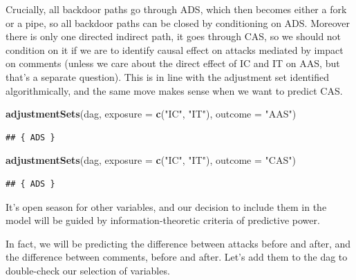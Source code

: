 \documentclass[10pt,dvipsnames,enabledeprecatedfontcommands]{scrartcl}
\newenvironment{Shaded}{\begin{snugshade}}{\end{snugshade}}
\newcommand{\DataTypeTok}[1]{\textcolor[rgb]{0.13,0.29,0.53}{#1}}
\newcommand{\KeywordTok}[1]{\textcolor[rgb]{0.13,0.29,0.53}{\textbf{#1}}}
\newcommand{\NormalTok}[1]{#1}
\newcommand{\StringTok}[1]{\textcolor[rgb]{0.31,0.60,0.02}{#1}}
\begin{document}
\normalsize

Crucially, all backdoor paths go through \textsf{ADS}, which then
becomes either a fork or a pipe, so all backdoor paths can be closed by
conditioning on \textsf{ADS}. Moreover there is only one directed
indirect path, it goes through \textsf{CAS}, so we should not condition
on it if we are to identify causal effect on attacks mediated by impact
on comments (unless we care about the direct effect of \textsf{IC} and
\textsf{IT} on \textsf{AAS}, but that's a separate question). This is in
line with the adjustment set identified algorithmically, and the same
move makes sense when we want to predict \textsf{CAS}.

\vspace{1mm}
\footnotesize

\begin{Shaded}
\begin{Highlighting}[]
\KeywordTok{adjustmentSets}\NormalTok{(dag, }\DataTypeTok{exposure =} \KeywordTok{c}\NormalTok{(}\StringTok{"IC"}\NormalTok{, }\StringTok{"IT"}\NormalTok{), }\DataTypeTok{outcome =} \StringTok{"AAS"}\NormalTok{)}
\end{Highlighting}
\end{Shaded}

\begin{verbatim}
## { ADS }
\end{verbatim}

\begin{Shaded}
\begin{Highlighting}[]
\KeywordTok{adjustmentSets}\NormalTok{(dag, }\DataTypeTok{exposure =} \KeywordTok{c}\NormalTok{(}\StringTok{"IC"}\NormalTok{, }\StringTok{"IT"}\NormalTok{), }\DataTypeTok{outcome =} \StringTok{"CAS"}\NormalTok{)}
\end{Highlighting}
\end{Shaded}

\begin{verbatim}
## { ADS }
\end{verbatim}

\normalsize

It's open season for other variables, and our decision to include them
in the model will be guided by information-theoretic criteria of
predictive power.

In fact, we will be predicting the difference between attacks before and
after, and the difference between comments, before and after. Let's add
them to the dag to double-check our selection of variables.
\end{document}
